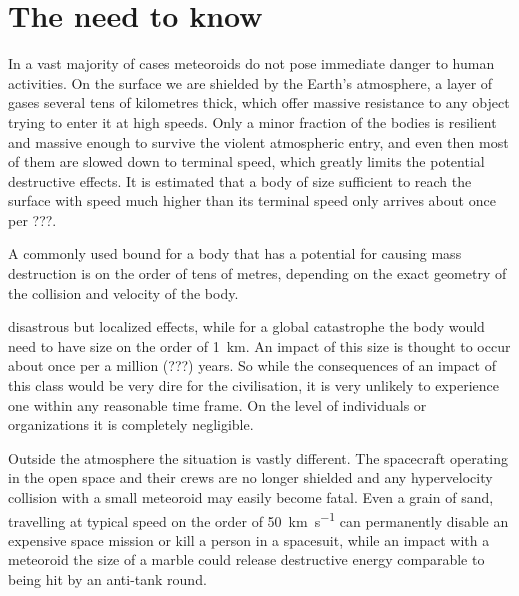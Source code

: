 
\section{The need to know}
    In a vast majority of cases meteoroids do not pose immediate danger to human activities.
    On the surface we are shielded by the Earth's atmosphere, a layer of gases several tens of kilometres
    thick, which offer massive resistance to any object trying to enter it at high speeds.
    Only a minor fraction of the bodies is resilient and massive enough to survive the violent atmospheric entry,
    and even then most of them are slowed down to terminal speed, which greatly limits the potential destructive effects.
    It is estimated that a body of size sufficient to reach the surface with speed much higher than its terminal speed
    only arrives about once per ???.

    A commonly used bound for a body that has a potential for causing mass destruction is on the order of tens of metres,
    depending on the exact geometry of the collision and velocity of the body.

    disastrous but localized effects, while for a global catastrophe the body would need to have size on the order
    of \SI{1}{\kilo\metre}. An impact of this size is thought to occur about once per a million (???) years.
    So while the consequences of an impact of this class would be very dire for the civilisation,
    it is very unlikely to experience one within any reasonable time frame.
    On the level of individuals or organizations it is completely negligible.

    Outside the atmosphere the situation is vastly different.
    The spacecraft operating in the open space and their crews are no longer shielded
    and any hypervelocity collision with a small meteoroid may easily become fatal.
    Even a grain of sand, travelling at typical speed on the order of \SI{50}{\kilo\metre\per\second} can permanently disable
    an expensive space mission or kill a person in a spacesuit,
    while an impact with a meteoroid the size of a marble could release
    destructive energy comparable to being hit by an anti-tank round.

